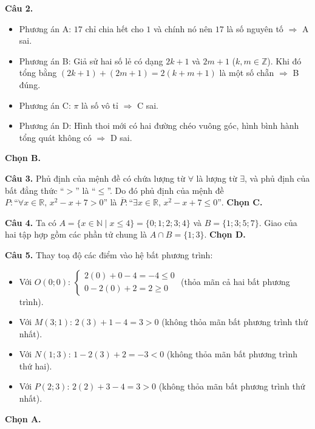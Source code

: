 \documentclass[12pt,a4paper]{article}
\begin{document}
\textbf{Câu 2.}
\begin{itemize}[leftmargin=0.5cm, itemsep=1pt, topsep=1pt]
    \item Phương án A: $17$ chỉ chia hết cho $1$ và chính nó nên $17$ là số nguyên tố $\Rightarrow$ A sai.
    \item Phương án B: Giả sử hai số lẻ có dạng $2k+1$ và $2m+1$ ($k, m \in \mathbb{Z}$). Khi đó tổng bằng $(2k+1) + (2m+1) = 2(k+m+1)$ là một số chẵn $\Rightarrow$ B đúng.
    \item Phương án C: $\pi$ là số vô tỉ $\Rightarrow$ C sai.
    \item Phương án D: Hình thoi mới có hai đường chéo vuông góc, hình bình hành tổng quát không có $\Rightarrow$ D sai.
\end{itemize}
\textbf{Chọn B.}

\textbf{Câu 3.} Phủ định của mệnh đề có chứa lượng từ $\forall$ là lượng từ $\exists$, và phủ định của bất đẳng thức ``$>$'' là ``$\le$''. Do đó phủ định của mệnh đề $P\colon \text{``}\forall x \in \mathbb{R},\, x^2 - x + 7 > 0\text{''}$ là $\overline{P}\colon \text{``}\exists x \in \mathbb{R},\, x^2 - x + 7 \le 0\text{''}$. \textbf{Chọn C.}

\textbf{Câu 4.} Ta có $A = \{x \in \mathbb{N} \mid x \le 4\} = \{0; 1; 2; 3; 4\}$ và $B = \{1; 3; 5; 7\}$. Giao của hai tập hợp gồm các phần tử chung là $A \cap B = \{1; 3\}$. \textbf{Chọn D.}

\textbf{Câu 5.} Thay toạ độ các điểm vào hệ bất phương trình:
\begin{itemize}[leftmargin=0.5cm, itemsep=1pt, topsep=1pt]
    \item Với $O(0; 0)$: $\begin{cases} 2(0) + 0 - 4 = -4 \le 0 \\ 0 - 2(0) + 2 = 2 \ge 0 \end{cases}$ (thỏa mãn cả hai bất phương trình).
    \item Với $M(3; 1)$: $2(3) + 1 - 4 = 3 > 0$ (không thỏa mãn bất phương trình thứ nhất).
    \item Với $N(1; 3)$: $1 - 2(3) + 2 = -3 < 0$ (không thỏa mãn bất phương trình thứ hai).
    \item Với $P(2; 3)$: $2(2) + 3 - 4 = 3 > 0$ (không thỏa mãn bất phương trình thứ nhất).
\end{itemize}
\textbf{Chọn A.}
\end{document}
